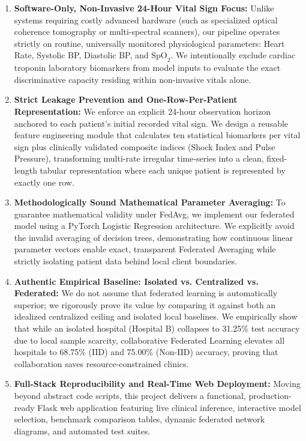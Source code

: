 \documentclass[12pt,a4paper,oneside]{report}
\begin{document}
\begin{enumerate}
    \item \textbf{Software-Only, Non-Invasive 24-Hour Vital Sign Focus:} Unlike systems requiring costly advanced hardware (such as specialized optical coherence tomography or multi-spectral scanners), our pipeline operates strictly on routine, universally monitored physiological parameters: Heart Rate, Systolic BP, Diastolic BP, and $\text{SpO}_2$. We intentionally exclude cardiac troponin laboratory biomarkers from model inputs to evaluate the exact discriminative capacity residing within non-invasive vitals alone.
    
    \item \textbf{Strict Leakage Prevention and One-Row-Per-Patient Representation:} We enforce an explicit 24-hour observation horizon anchored to each patient's initial recorded vital sign. We design a reusable feature engineering module that calculates ten statistical biomarkers per vital sign plus clinically validated composite indices (Shock Index and Pulse Pressure), transforming multi-rate irregular time-series into a clean, fixed-length tabular representation where each unique patient is represented by exactly one row.
    
    \item \textbf{Methodologically Sound Mathematical Parameter Averaging:} To guarantee mathematical validity under FedAvg, we implement our federated model using a PyTorch Logistic Regression architecture. We explicitly avoid the invalid averaging of decision trees, demonstrating how continuous linear parameter vectors enable exact, transparent Federated Averaging while strictly isolating patient data behind local client boundaries.
    
    \item \textbf{Authentic Empirical Baseline: Isolated vs. Centralized vs. Federated:} We do not assume that federated learning is automatically superior; we rigorously prove its value by comparing it against both an idealized centralized ceiling and isolated local baselines. We empirically show that while an isolated hospital (Hospital B) collapses to 31.25\% test accuracy due to local sample scarcity, collaborative Federated Learning elevates all hospitals to 68.75\% (IID) and 75.00\% (Non-IID) accuracy, proving that collaboration saves resource-constrained clinics.
    
    \item \textbf{Full-Stack Reproducibility and Real-Time Web Deployment:} Moving beyond abstract code scripts, this project delivers a functional, production-ready Flask web application featuring live clinical inference, interactive model selection, benchmark comparison tables, dynamic federated network diagrams, and automated test suites.
\end{enumerate}
\end{document}
